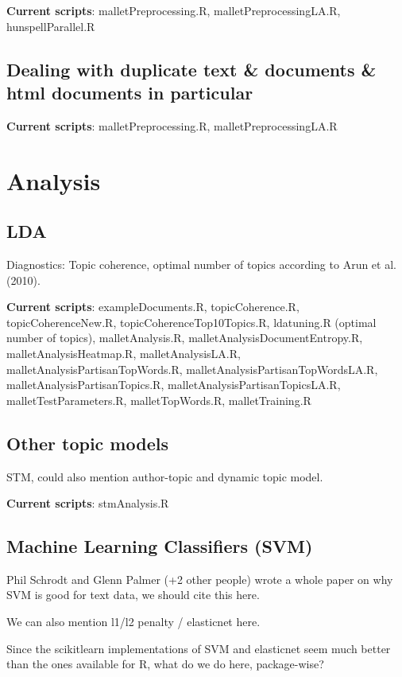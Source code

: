 \documentclass[11pt]{article}
\begin{document}
\textbf{Current scripts}: malletPreprocessing.R, malletPreprocessingLA.R, hunspellParallel.R

\subsection{Dealing with duplicate text \& documents \& html documents in particular} \label{preprocessing_duplicates}

\textbf{Current scripts}: malletPreprocessing.R, malletPreprocessingLA.R

\section{Analysis}
\subsection{LDA}

Diagnostics: Topic coherence, optimal number of topics according to Arun et al. (2010).

\textbf{Current scripts}: exampleDocuments.R, topicCoherence.R, topicCoherenceNew.R, topicCoherenceTop10Topics.R, ldatuning.R (optimal number of topics), malletAnalysis.R, malletAnalysisDocumentEntropy.R, malletAnalysisHeatmap.R, malletAnalysisLA.R, malletAnalysisPartisanTopWords.R, malletAnalysisPartisanTopWordsLA.R, malletAnalysisPartisanTopics.R, malletAnalysisPartisanTopicsLA.R, malletTestParameters.R, malletTopWords.R, malletTraining.R

\subsection{Other topic models}
STM, could also mention author-topic and dynamic topic model.

\textbf{Current scripts}: stmAnalysis.R

\subsection{Machine Learning Classifiers (SVM)}
Phil Schrodt and Glenn Palmer (+2 other people) wrote a whole paper on why SVM is good for text data, we should cite this here.

We can also mention l1/l2 penalty / elasticnet here.

Since the scikitlearn implementations of SVM and elasticnet seem much better than the ones available for R, what do we do here, package-wise?
\end{document}
